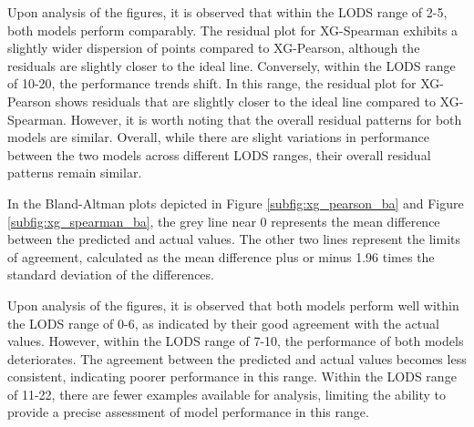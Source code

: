 \documentclass[12pt,a4paper,english
]{tunithesis}
\begin{document}
Upon analysis of the figures, it is observed that within the LODS range of 2-5, both models perform comparably. The residual plot for XG-Spearman exhibits a slightly wider dispersion of points compared to XG-Pearson, although the residuals are slightly closer to the ideal line. Conversely, within the LODS range of 10-20, the performance trends shift. In this range, the residual plot for XG-Pearson shows residuals that are slightly closer to the ideal line compared to XG-Spearman. However, it is worth noting that the overall residual patterns for both models are similar. Overall, while there are slight variations in performance between the two models across different LODS ranges, their overall residual patterns remain similar.

In the Bland-Altman plots depicted in Figure \ref{subfig:xg_pearson_ba} and Figure \ref{subfig:xg_spearman_ba}, the grey line near 0 represents the mean difference between the predicted and actual values. The other two lines represent the limits of agreement, calculated as the mean difference plus or minus 1.96 times the standard deviation of the differences.

Upon analysis of the figures, it is observed that both models perform well within the LODS range of 0-6, as indicated by their good agreement with the actual values. However, within the LODS range of 7-10, the performance of both models deteriorates. The agreement between the predicted and actual values becomes less consistent, indicating poorer performance in this range. Within the LODS range of 11-22, there are fewer examples available for analysis, limiting the ability to provide a precise assessment of model performance in this range.
\end{document}
